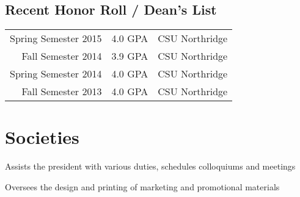 \documentclass[letterpaper]{deedy-resume} %
\begin{document}
\begin{minipage}[t]{0.66\textwidth}
\subsection{Recent Honor Roll / Dean's List} 

\begin{tabular}{rll}
Spring Semester 2015 & 4.0 GPA & CSU Northridge\\
Fall Semester 2014 & 3.9 GPA & CSU Northridge\\
Spring Semester 2014 & 4.0 GPA & CSU Northridge\\
Fall Semester 2013 & 4.0 GPA & CSU Northridge\\
\end{tabular}

\sectionspace %


\section{Societies}
\begin{tightitemize}
\item Assists the president with various duties, schedules colloquiums and meetings
\item Oversees the design and printing of marketing and promotional materials
\end{tightitemize}

\sectionspace %



\end{minipage} %



\end{document}
